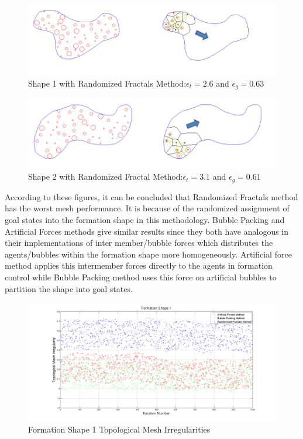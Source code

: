 \begin{figure}[H]
\caption{Shape 1 with Randomized Fractals Method:$\epsilon_t = 2.6$ and $\epsilon_g = 0.63$}
\label{fififi5}
\centerline{\includegraphics[scale = 0.70]{Randomized_Fractals_Mesh_1}}
\end{figure} 	

\begin{figure}[H]
\caption{Shape 2 with Randomized Fractal Method:$\epsilon_t = 3.1$ and $\epsilon_g = 0.61$}
\label{fififi6}
\centerline{\includegraphics[scale = 0.65]{Randomized_Fractals_Mesh_2}}
\end{figure} 	

According to these figures, it can be concluded that Randomized Fractals method has the worst mesh performance. It is because of the randomized assignment of goal states into the formation shape in this methodology. Bubble Packing and Artificial Forces methods give similar results since they both have analogous in their implementations of inter member/bubble forces which distributes the agents/bubbles within the formation shape more homogeneously. Artificial force method applies this intermember forces directly to the agents in formation control while Bubble Packing method uses this force on artificial bubbles to partition the shape into goal states. 
		
\begin{figure}[H]
\caption{Formation Shape 1 Topological Mesh Irregularities} \label{topologic_ref_1}
\centerline{\includegraphics[scale = 0.32]{Topological_Irr_1}}
\end{figure} 	
		
